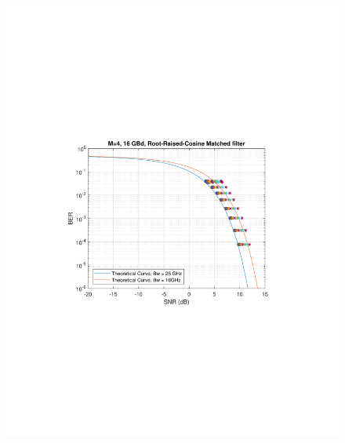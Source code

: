 \begin{refsection}
\begin{figure}[H]
	\centering
	\begin{minipage}{0.43\textwidth}
		\centering
		\includegraphics[clip, trim=4cm 8cm 4cm 8cm,
		width=1\textwidth]{./sdf/m_qam_system/figures/snr/snrVsBer/16GBdAllSnrVsBER.pdf}
		\subcaption{\label{fig:snrAbsDev_16_500}}
	\end{minipage}
	\begin{minipage}{0.43\textwidth}
		\centering

\end{minipage}
\end{figure}
\end{refsection}
